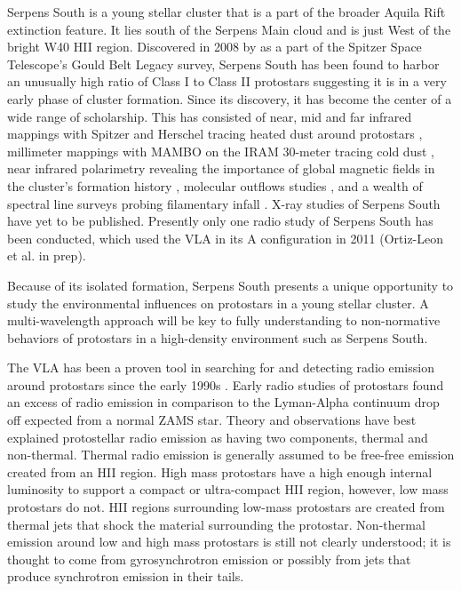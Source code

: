 \documentclass[apj]{emulateapj}
\begin{document}
	Serpens South is a young stellar cluster that is a part of the broader Aquila Rift extinction feature. It lies south of the Serpens Main cloud and is just West of the bright W40 HII region. Discovered in 2008 by \citet{Gutermuth08} as a part of the Spitzer Space Telescope's Gould Belt Legacy survey, Serpens South has been found to harbor an unusually high ratio of Class I to Class II protostars suggesting it is in a very early phase of cluster formation. Since its discovery, it has become the center of a wide range of scholarship. This has consisted of near, mid and far infrared mappings with Spitzer and Herschel tracing heated dust around protostars \citep{Gutermuth08, Bontemps10}, millimeter mappings with MAMBO on the IRAM 30-meter tracing cold dust \citep{Maury11}, near infrared polarimetry revealing the importance of global magnetic fields in the cluster's formation history \citep{Sugitani11}, molecular outflows studies \citep{Nakamura11, Teixeira12}, and a wealth of spectral line surveys probing filamentary infall \citep{Kirk13, Friesen13, Tanaka13, FernandezLopez14,Nakamura14a}. X-ray studies of Serpens South have yet to be published. Presently only one radio study of Serpens South has been conducted, which used the VLA in its A configuration in 2011 (Ortiz-Leon et al. in prep). 
	
	Because of its isolated formation, Serpens South presents a unique opportunity to study the environmental influences on protostars in a young stellar cluster. A multi-wavelength approach will be key to fully understanding to non-normative behaviors of protostars in a high-density environment such as Serpens South.
	 
	 
	The VLA has been a proven tool in searching for and detecting radio emission around protostars since the early 1990s \citep[e.g.,][]{Curiel89, Anglada98, Reipurth99, Beltran01, Eiroa05, Shirley07, Rodriguez10}. Early radio studies of protostars found an excess of radio emission in comparison to the Lyman-Alpha continuum drop off expected from a normal ZAMS star. Theory and observations have best explained protostellar radio emission as having two components, thermal and non-thermal. Thermal radio emission is generally assumed to be free-free emission created from an HII region. High mass protostars have a high enough internal luminosity to support a compact or ultra-compact HII region, however, low mass protostars do not. HII regions surrounding low-mass protostars are created from thermal jets that shock the material surrounding the protostar. Non-thermal emission around low and high mass protostars is still not clearly understood; it is thought to come from gyrosynchrotron emission or possibly from jets that produce synchrotron emission in their tails. 
\end{document}
